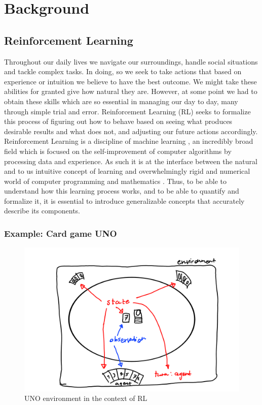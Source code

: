 \chapter{Background}\label{chap:theory}
\section{Reinforcement Learning}\label{sec:RL}

Throughout our daily lives we navigate our surroundings, handle social situations and tackle complex tasks. In doing, so we seek to take actions that based on experience or intuition we believe to have the best outcome. We might take these abilities for granted give how natural they are. However, at some point we had to obtain these skills which are so essential in managing our day to day, many through simple trial and error. Reinforcement Learning (RL) seeks to formalize this process of figuring out how to behave based on seeing what produces desirable results and what does not, and adjusting our future actions accordingly. 
Reinforcement Learning is a discipline of machine learning \cite[p. 1]{sutton_reinforcement_2018} , an incredibly broad field which is focused on the self-improvement of computer algorithms by processing data and experience. 
As such it is at the interface between the natural and to us intuitive concept of learning and overwhelmingly rigid and numerical world of computer programming and mathematics \cite[p. 4]{sutton_reinforcement_2018}. Thus, to be able to understand how this learning process works, and to be able to quantify and formalize it, it is essential to introduce generalizable concepts that accurately describe its components. 

\subsection*{Example: Card game UNO}\label{subsec:UNO}

\begin{figure}[ht]
    \centering
    \includegraphics[width=\linewidth]{figures/UNO.png}
    \caption{UNO environment in the context of RL}
    \label{fig:UNO}
\end{figure}

